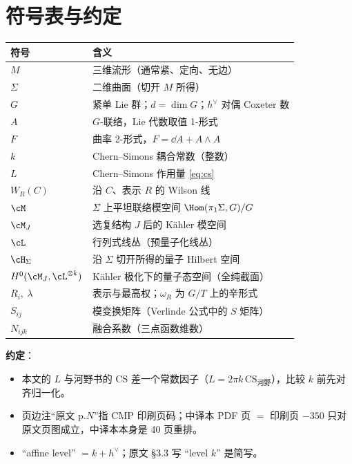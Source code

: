 \section{符号表与约定}
\label{app:symbols}

\begin{center}
\small
\begin{tabular}{@{}ll@{}}
\toprule
符号 & 含义 \\
\midrule
$M$ & 三维流形（通常紧、定向、无边）\\
$\Sigma$ & 二维曲面（切开 $M$ 所得）\\
$G$ & 紧单 Lie 群；$d=\dim G$；$h^\vee$ 对偶 Coxeter 数 \\
$A$ & $G$-联络，Lie 代数取值 1-形式 \\
$F$ & 曲率 2-形式，$F=\dd A+A\wedge A$ \\
$k$ & Chern--Simons 耦合常数（整数）\\
$L$ & Chern--Simons 作用量 \eqref{eq:cs} \\
$W_R(C)$ & 沿 $C$、表示 $R$ 的 Wilson 线 \\
$\cM$ & $\Sigma$ 上平坦联络模空间 $\Hom(\pi_1\Sigma,G)/G$ \\
$\cM_J$ & 选复结构 $J$ 后的 K\"ahler 模空间 \\
$\cL$ & 行列式线丛（预量子化线丛）\\
$\cH_\Sigma$ & 沿 $\Sigma$ 切开所得的量子 Hilbert 空间 \\
$H^0(\cM_J,\cL^{\otimes k})$ & K\"ahler 极化下的量子态空间（全纯截面）\\
$R_i,\ \lambda$ & 表示与最高权；$\omega_R$ 为 $G/T$ 上的辛形式 \\
$S_{ij}$ & 模变换矩阵（Verlinde 公式中的 $S$ 矩阵）\\
$N_{ijk}$ & 融合系数（三点函数维数）\\
\bottomrule
\end{tabular}
\end{center}

\textbf{约定}：
\begin{itemize}[leftmargin=1.6em]
\item 本文的 $L$ 与河野书的 $\mathrm{CS}$ 差一个常数因子（$L=2\pi k\,\mathrm{CS}_{\text{河野}}$），比较 $k$ 前先对齐归一化。
\item 页边注“原文 p.$N$”指 CMP 印刷页码；中译本 PDF 页 $=$ 印刷页 $-350$ 只对原文页图成立，中译本本身是 40 页重排。
\item “affine level” $=k+h^\vee$；原文 §3.3 写 “level $k$” 是简写。
\end{itemize}

